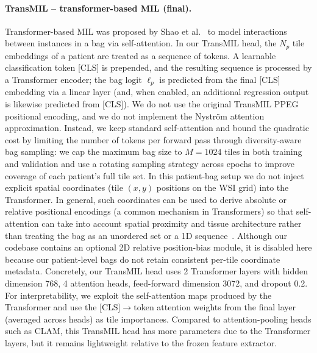\paragraph{TransMIL – transformer-based MIL (final).}
Transformer-based MIL was proposed by Shao et al.~\cite{shao2021} to model interactions between instances in a bag via self-attention. In our TransMIL head, the $N_p$ tile embeddings of a patient are treated as a sequence of tokens. A learnable classification token [CLS] is prepended, and the resulting sequence is processed by a Transformer encoder; the bag logit $\ell_p$ is predicted from the final [CLS] embedding via a linear layer (and, when enabled, an additional regression output is likewise predicted from [CLS]). We do not use the original TransMIL PPEG positional encoding, and we do not implement the Nyström attention approximation. Instead, we keep standard self-attention and bound the quadratic cost by limiting the number of tokens per forward pass through diversity-aware bag sampling: we cap the maximum bag size to $M=1024$ tiles in both training and validation and use a rotating sampling strategy across epochs to improve coverage of each patient’s full tile set. In this patient-bag setup we do not inject explicit spatial coordinates (tile $(x,y)$ positions on the WSI grid) into the Transformer. In general, such coordinates can be used to derive absolute or relative positional encodings (a common mechanism in Transformers) so that self-attention can take into account spatial proximity and tissue architecture rather than treating the bag as an unordered set or a 1D sequence~\cite{shao2021}. Although our codebase contains an optional 2D relative position-bias module, it is disabled here because our patient-level bags do not retain consistent per-tile coordinate metadata. Concretely, our TransMIL head uses 2 Transformer layers with hidden dimension 768, 4 attention heads, feed-forward dimension 3072, and dropout 0.2. For interpretability, we exploit the self-attention maps produced by the Transformer and use the [CLS]$\rightarrow$token attention weights from the final layer (averaged across heads) as tile importances. Compared to attention-pooling heads such as CLAM, this TransMIL head has more parameters due to the Transformer layers, but it remains lightweight relative to the frozen feature extractor.


